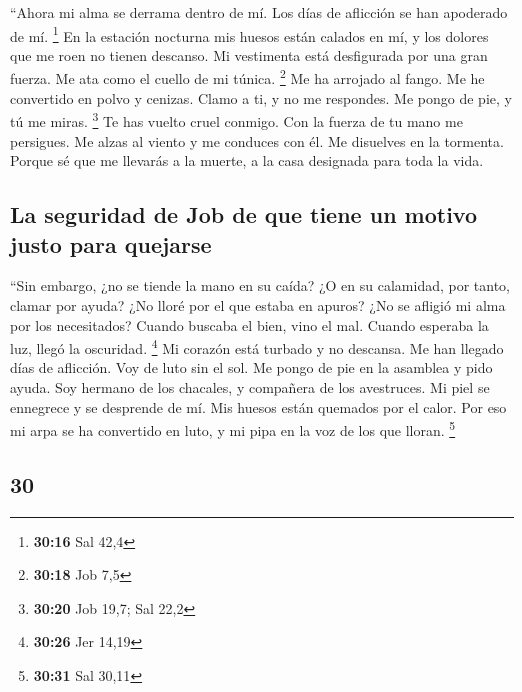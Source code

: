 \begin{paracol}{2}
 ``Ahora mi alma se derrama dentro de mí. Los días de
aflicción se han apoderado de mí. \footnote{\textbf{30:16} Sal 42,4}
 En la estación nocturna mis huesos están calados en mí,
y los dolores que me roen no tienen descanso.  Mi
vestimenta está desfigurada por una gran fuerza. Me ata como el cuello
de mi túnica. \footnote{\textbf{30:18} Job 7,5}  Me ha
arrojado al fango. Me he convertido en polvo y cenizas. 
Clamo a ti, y no me respondes. Me pongo de pie, y tú me miras.
\footnote{\textbf{30:20} Job 19,7; Sal 22,2}  Te has
vuelto cruel conmigo. Con la fuerza de tu mano me persigues.
 Me alzas al viento y me conduces con él. Me disuelves en
la tormenta.  Porque sé que me llevarás a la muerte, a la
casa designada para toda la vida.

\hypertarget{la-seguridad-de-job-de-que-tiene-un-motivo-justo-para-quejarse}{%
\subsection{La seguridad de Job de que tiene un motivo justo para
quejarse}\label{la-seguridad-de-job-de-que-tiene-un-motivo-justo-para-quejarse}}

 ``Sin embargo, ¿no se tiende la mano en su caída? ¿O en
su calamidad, por tanto, clamar por ayuda?  ¿No lloré por
el que estaba en apuros? ¿No se afligió mi alma por los necesitados?
 Cuando buscaba el bien, vino el mal. Cuando esperaba la
luz, llegó la oscuridad. \footnote{\textbf{30:26} Jer 14,19}
 Mi corazón está turbado y no descansa. Me han llegado
días de aflicción.  Voy de luto sin el sol. Me pongo de
pie en la asamblea y pido ayuda.  Soy hermano de los
chacales, y compañera de los avestruces.  Mi piel se
ennegrece y se desprende de mí. Mis huesos están quemados por el calor.
 Por eso mi arpa se ha convertido en luto, y mi pipa en
la voz de los que lloran. \footnote{\textbf{30:31} Sal 30,11}

\switchcolumn
\begin{otherlanguage}{english}

\hypertarget{section-59}{%
\section{30}\label{section-59}}


\end{otherlanguage}
\end{paracol}
